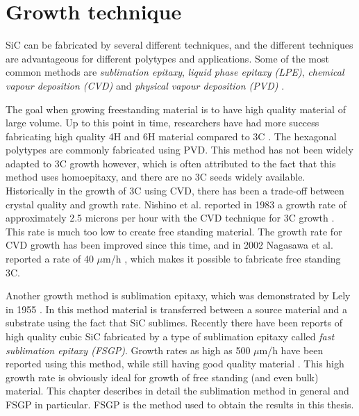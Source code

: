 \chapter{Growth technique}
\label{sec:growth}


SiC can be fabricated by several different techniques, and the different techniques are advantageous for different polytypes and applications. Some of the most common methods are \emph{sublimation epitaxy}, \emph{liquid phase epitaxy (LPE)}, \emph{chemical vapour deposition (CVD)} and \emph{physical vapour deposition (PVD)} \cite{Ivanov1999}. 

The goal when growing freestanding material is to have high quality material of large volume. Up to this point in time, researchers have had more success fabricating high quality 4H and 6H material compared to 3C \cite{J.B.CASADYandR.W.JOHNSON1996}. The hexagonal polytypes are commonly fabricated using PVD. This method has not been widely adapted to 3C growth however, which is often attributed to the fact that this method uses homoepitaxy, and there are no 3C seeds widely available. Historically in the growth of 3C using CVD, there has been a trade-off between crystal quality and growth rate. Nishino et al. reported in 1983 a growth rate of approximately 2.5 microns per hour with the CVD technique for 3C growth \cite{Nishino1983}. This rate is much too low to create free standing material. The growth rate for CVD growth has been improved since this time, and in 2002 Nagasawa et al. reported a rate of 40 $\mu$m/h \cite{Nagasawa2002}, which makes it possible to fabricate free standing 3C. 

Another growth method is sublimation epitaxy, which was demonstrated by Lely in 1955 \cite{Lely1955}. In this method material is transferred between a source material and a substrate using the fact that SiC sublimes. Recently there have been reports of high quality cubic SiC fabricated by a type of sublimation epitaxy called \emph{fast sublimation epitaxy (FSGP)}. Growth rates as high as 500 $\mu$m/h have been reported using this method, while still having good quality material \cite{Jokubavicius2014}. This high growth rate is obviously ideal for growth of free standing (and even bulk) material. This chapter describes in detail the sublimation method in general and FSGP in particular. FSGP is the method used to obtain the results in this thesis. 
 
